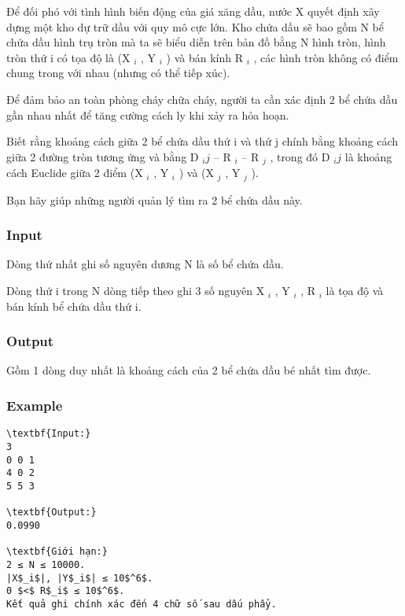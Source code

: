 



   Để đối phó với tình hình biến động của giá xăng dầu, nước X quyết định xây dựng một kho dự trữ dầu với quy mô cực lớn. Kho chứa dầu sẽ bao gồm N bể chứa dầu hình trụ tròn mà ta sẽ biểu diễn trên bản đồ bằng N hình tròn, hình tròn thứ i có tọa độ là (X   $_    i   $   , Y   $_    i   $   ) và bán kính R   $_    i   $   , các hình tròn không có điểm chung trong với nhau (nhưng có thể tiếp xúc).  

   Để đảm bảo an toàn phòng cháy chữa cháy, người ta cần xác định 2 bể chứa dầu gần nhau nhất để tăng cường cách ly khi xảy ra hỏa hoạn.  

   Biết rằng khoảng cách giữa 2 bể chứa dầu thứ i và thứ j chính bằng khoảng cách giữa 2 đường tròn tương ứng và bằng D   $_    ij   $   – R   $_    i   $   – R   $_    j   $   , trong đó D   $_    ij   $   là khoảng cách Euclide giữa 2 điểm (X   $_    i   $   , Y   $_    i   $   ) và (X   $_    j   $   , Y   $_    j   $   ).  

   Bạn hãy giúp những người quản lý tìm ra 2 bể chứa dầu này.  

\subsubsection{   Input  }

   Dòng thứ nhất ghi số nguyên dương N là số bể chứa dầu.  

   Dòng thứ i trong N dòng tiếp theo ghi 3 số nguyên X   $_    i   $   , Y   $_    i   $   , R   $_    i   $   là tọa độ và bán kính bể chứa dầu thứ i.  

\subsubsection{   Output  }

   Gồm 1 dòng duy nhất là khoảng cách của 2 bể chứa dầu bé nhất tìm được.  

\subsubsection{   Example  }
\begin{verbatim}
\textbf{Input:}
3
0 0 1
4 0 2
5 5 3

\textbf{Output:}
0.0990

\textbf{Giới hạn:}
2 ≤ N ≤ 10000. 
|X$_i$|, |Y$_i$| ≤ 10$^6$.
0 $<$ R$_i$ ≤ 10$^6$. 
Kết quả ghi chính xác đến 4 chữ số sau dấu phẩy.
\end{verbatim}
